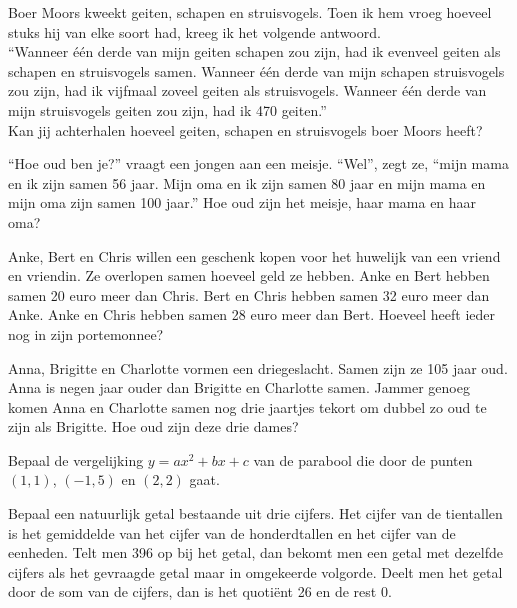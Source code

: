\documentclass[12pt,twoside]{article}
\begin{document}
\begin{oefening}
Boer Moors kweekt geiten, schapen en struisvogels.  Toen ik hem vroeg hoeveel stuks hij van elke soort had, kreeg ik het volgende antwoord.\\
“Wanneer één derde van mijn geiten schapen zou zijn, had ik evenveel geiten als schapen en struisvogels samen.
Wanneer één derde van mijn schapen struisvogels zou zijn, had ik vijfmaal zoveel geiten als struisvogels.
Wanneer één derde van mijn struisvogels geiten zou zijn, had ik 470 geiten.”\\
Kan jij achterhalen hoeveel geiten, schapen en struisvogels boer Moors heeft?
\end{oefening}

\begin{oefening}
“Hoe oud ben je?” vraagt een jongen aan een meisje.
“Wel”, zegt ze, “mijn mama en ik zijn samen 56 jaar.  Mijn oma en ik zijn samen 80 jaar en mijn mama en mijn oma zijn samen 100 jaar.”
Hoe oud zijn het meisje, haar mama en haar oma?
\end{oefening}

\begin{oefening}
Anke, Bert en Chris willen een geschenk kopen voor het huwelijk van een vriend en vriendin.
Ze overlopen samen hoeveel geld ze hebben.
Anke en Bert hebben samen 20 euro meer dan Chris.
Bert en Chris hebben samen 32 euro meer dan Anke.
Anke en Chris hebben samen 28 euro meer dan Bert.
Hoeveel heeft ieder nog in zijn portemonnee?
\end{oefening}

\begin{oefening}
Anna, Brigitte en Charlotte vormen een driegeslacht.  Samen zijn ze 105 jaar oud.  Anna is negen jaar ouder dan Brigitte en Charlotte samen.  Jammer genoeg komen Anna en Charlotte samen nog drie jaartjes tekort om dubbel zo oud te zijn als Brigitte.
Hoe oud zijn deze drie dames?
\end{oefening}

\begin{oefening}
Bepaal de vergelijking $y=ax^2+bx+c$ van de parabool die door de punten $(1,1)$, $(-1, 5)$ en $(2,2)$ gaat.
\end{oefening}

\begin{oefening}
Bepaal een natuurlijk getal bestaande uit drie cijfers. Het cijfer van de tientallen is het gemiddelde van het cijfer van de honderdtallen en het cijfer van de eenheden. Telt men 396 op bij het getal, dan bekomt men een getal met dezelfde cijfers als het gevraagde getal maar in omgekeerde volgorde. Deelt men het getal door de som van de cijfers, dan is het quotiënt 26 en de rest 0.
\end{oefening}
\end{document}
